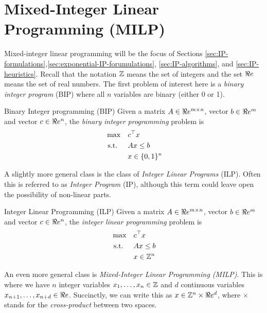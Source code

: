 \section{Mixed-Integer Linear Programming (MILP)}
Mixed-integer linear programming will be the focus of Sections \ref{sec:IP-formulations},\ref{sec:exponential-IP-forumulations}, \ref{sec:IP-algorithms}, and \ref{sec:IP-heuristics}.
Recall that the notation ${\mathbb{Z}}$ means the set of integers and the set $\Re e$ means the set of real numbers.  The first problem of interest here is a \emph{binary integer program} (BIP) where all $n$ variables are binary (either 0 or 1).

\begin{general}{Binary Integer programming (BIP)}{\npcomplete}
Given a matrix $A \in \Re e^{m\times n}$, vector $b \in \Re e^m$ and vector $c \in \Re e^n$, the \emph{binary integer programming} problem is
\begin{equation}
\label{eq:BIP}
\begin{split}
\max \quad & c^\top x\\
\mbox{ s.t. }  \quad & Ax \leq b\\
& x \in \{0,1\}^n
\end{split}
\end{equation}
\end{general}
A slightly more general class is the class of \emph{Integer Linear Programs} (ILP).  Often this is referred to as \emph{Integer Program} (IP), although this term could leave open the possibility of non-linear parts.



\begin{general}{Integer Linear Programming (ILP)}{\npcomplete}
Given a matrix $A \in \Re e^{m\times n}$, vector $b \in \Re e^m$ and vector $c \in \Re e^n$, the \emph{integer linear programming} problem is
\begin{equation}
\label{eq:ILP}
\begin{split}
\max \quad & c^\top x\\
\mbox{ s.t. }  \quad & Ax \leq b\\
& x \in {\mathbb{Z}}^n
\end{split}
\end{equation}
\end{general}


An even more general class is \emph{Mixed-Integer Linear Programming (MILP)}.  This is where we have $n$ integer variables $x_1, \dots, x_n \in {\mathbb{Z}}$ and $d$ continuous variables $x_{n+1}, \dots, x_{n+d} \in \Re e$.  Succinctly, we can write this as $x \in {\mathbb{Z}}^n \times \Re e^d$, where $\times$ stands for the \emph{cross-product} between two spaces.   

